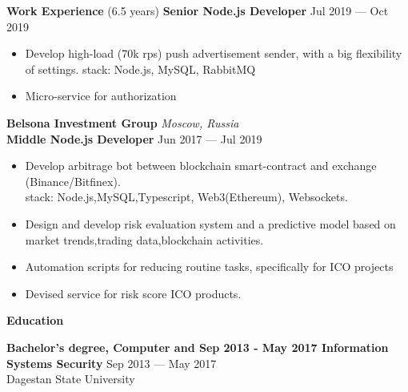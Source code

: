 \documentclass{resume} %
\begin{document}
\begin{rSection}{\textbf{Work Experience} (6.5 years) }
\textbf{Senior Node.js Developer} \hfill Jul 2019 --- Oct 2019
\begin{itemize}
    \setlength\itemsep{-0.3em}
    \item Develop high-load (70k rps) push advertisement sender, with a big flexibility of settings.
    stack: Node.js, MySQL, RabbitMQ
    \item Micro-service for authorization
\end{itemize}

\textbf{Belsona Investment Group} \hfill \textit{Moscow, Russia} \\
\textbf{Middle Node.js Developer}  \hfill Jun 2017 --- Jul 2019
\begin{itemize}
    \setlength\itemsep{-0.3em}
    \item Develop arbitrage bot between blockchain smart-contract and exchange (Binance/Bitfinex).
    	 \\ stack: Node.js,MySQL,Typescript, Web3(Ethereum), Websockets.
    \item Design and develop risk evaluation system and a predictive model based on market trends,trading data,blockchain activities.
    \item Automation scripts for reducing routine tasks, specifically for ICO projects
    \item Devised service for risk score ICO products.
\end{itemize}

\end{rSection}



\begin{rSection}{\textbf{Education}}

\textbf{Bachelor's degree, Computer and Sep 2013 - May 2017 Information Systems Security} \hfill {Sep 2013 --- May 2017} \\
	  Dagestan State University

\end{rSection}
\end{document}
